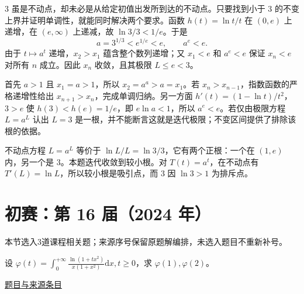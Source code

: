\documentclass[UTF8,12pt,a4paper,fontset=fandol]{ctexart}
\begin{document}
\begin{solve}\label{ans:ch03-15th-A:6}

$3$ 虽是不动点，却未必是从给定初值出发所到达的不动点。只要找到小于 $3$ 的不变上界并证明单调性，就能同时解决两个要求。函数 $h(t)=\ln t/t$ 在 $(0,e)$ 上递增，在 $(e,\infty)$ 上递减，故 $\ln3/3<1/e$。于是
\[
a=3^{1/3}<e^{1/e}<e,\qquad a^e<e.
\]
由于 $t\mapsto a^t$ 递增，$x_2>x_1$ 蕴含整个数列递增；又 $x_1<e$ 和 $a^e<e$ 保证 $x_n<e$ 对所有 $n$ 成立。因此 $x_n$ 收敛，且其极限 $L\leq e<3$。

首先 $a>1$ 且 $x_1=a>1$，所以 $x_2=a^a>a=x_1$。若 $x_n>x_{n-1}$，指数函数的严格递增性给出 $x_{n+1}>x_n$，完成单调归纳。另一方面 $h'(t)=(1-\ln t)/t^2$，$3>e$ 使 $h(3)<h(e)=1/e$，即 $e\ln a<1$，所以 $a^e<e$。若仅由极限方程 $L=a^L$ 认出 $L=3$ 是一根，并不能断言这就是迭代极限；不变区间提供了排除该根的依据。

\end{solve}

\begin{remark}[方法与条件]不动点方程 $L=a^L$ 等价于 $\ln L/L=\ln3/3$，它有两个正根：一个在 $(1,e)$ 内，另一个是 $3$。本题迭代收敛到较小根。对 $T(t)=a^t$，在不动点有 $T'(L)=\ln L$，所以较小根是吸引点，而 $3$ 因 $\ln3>1$ 为排斥点。\end{remark}

\section{初赛：第 16 届（2024 年）}

本节选入3道课程相关题；来源序号保留原题解编排，未选入题目不重新补号。

\begin{example}[来源序号2]\label{ex:ch02-16th-A:2}\label{pr:ch02-16th-A:2}

设 $\varphi(t)=\int_{0}^{+\infty} \frac{\ln(1+tx^{2})}{x(1+x^{2})} \mathrm{d} x, t \geq 0$，求 $\varphi(1), \varphi(2)$。

\par\href{https://github.com/lzxcr/cmc-mathematics/blob/64916fa1fdbc3e444a652eca204d5669058ee321/src/problems/preliminary/16/02.md}{题目与来源条目}

\end{example}
\end{document}
